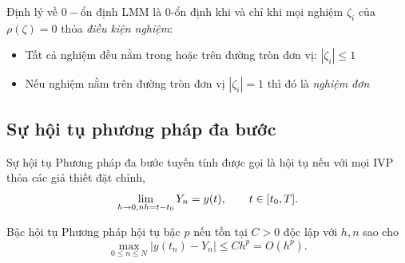 \documentclass[aspectratio=43]{beamer}
\begin{document}
\begin{frame}

\begin{baitapbox}{Định lý về $0-$ổn định}
LMM là 0-ổn định khi và chỉ khi mọi nghiệm $\zeta_i$ của $\rho(\zeta)=0$ thỏa \textit{điều kiện nghiệm}:
\begin{itemize}
    \item Tất cả nghiệm đều nằm trong hoặc trên đường tròn đơn vị: $|\zeta_i|\le1$
    \item Nếu nghiệm nằm trên đường tròn đơn vị $|\zeta_i|=1$ thì đó là \textit{nghiệm đơn}
\end{itemize}
\end{baitapbox}


\end{frame}
\subsection*{Sự hội tụ phương pháp đa bước}
\begin{frame}
\begin{baitapbox}{Sự hội tụ}
Phương pháp đa bước tuyến tính được gọi là hội tụ nếu với mọi IVP thỏa các giả thiết đặt chỉnh,
\[
 \displaystyle\lim_{h\to 0 , \\ nh=t-t_0}Y_n=y(t),
 \qquad t\in[t_0,T].
\]
\end{baitapbox}
\begin{baitapbox}{Bậc hội tụ}
Phương pháp hội tụ bậc $p$ nếu tồn tại $C>0$ độc lập với $h,n$ sao cho
\[
 \max_{0\le n\le N}|y(t_n)-Y_n|\le Ch^p=O(h^p).
\]
\end{baitapbox}
\end{frame}
\end{document}

